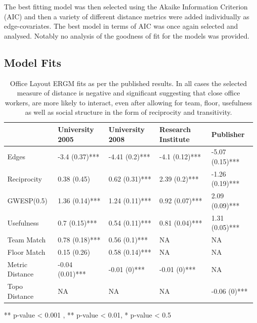 \documentclass[
]{statsoc}
\begin{document}
The best fitting model was then selected using the Akaike Information
Criterion (AIC) and then a variety of different distance metrics were
added individually as edge-covariates. The best model in terms of AIC
was once again selected and analysed. Notably no analysis of the
goodness of fit for the models was provided.

\subsection{Model Fits}

\begin{table}

\caption{\label{tab:unnamed-chunk-2}\label{tab:sailer_ergm_pub} Office Layout ERGM fits as per the published results. In all cases the selected measure of distance is negative and significant suggesting that close office workers, are more likely to interact, even after allowing for team, floor, usefulness as well as social structure in the form of reciprocity and transitivity.}
\centering
\begin{threeparttable}
\begin{tabular}[t]{lllll}
\toprule
  & University 2005 & University 2008 & Research Institute & Publisher\\
\midrule
\rowcolor{gray!6}  Edges & -3.4 (0.37)*** & -4.41 (0.2)*** & -4.1 (0.12)*** & -5.07 (0.15)***\\
Reciprocity & 0.38 (0.45) & 0.62 (0.31)*** & 2.39 (0.2)*** & -1.26 (0.19)***\\
\rowcolor{gray!6}  GWESP(0.5) & 1.36 (0.14)*** & 1.24 (0.11)*** & 0.92 (0.07)*** & 2.09 (0.09)***\\
Usefulness & 0.7 (0.15)*** & 0.54 (0.11)*** & 0.81 (0.04)*** & 1.31 (0.05)***\\
\rowcolor{gray!6}  Team Match & 0.78 (0.18)*** & 0.56 (0.1)*** & NA & NA\\
\addlinespace
Floor Match & 0.15 (0.26) & 0.58 (0.14)*** & NA & NA\\
\rowcolor{gray!6}  Metric Distance & -0.04 (0.01)*** & -0.01 (0)*** & -0.01 (0)*** & NA\\
Topo Distance & NA & NA & NA & -0.06 (0)***\\
\bottomrule
\end{tabular}
\begin{tablenotes}
\item *** p-value < 0.001 , ** p-value < 0.01, * p-value < 0.5
\end{tablenotes}
\end{threeparttable}
\end{table}
\end{document}
